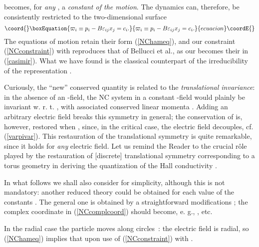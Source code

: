 \documentclass[a4paper,11pt]{article}
\providecommand{\vx}{{\vec x}}
\def\vgamma{{\vec\gamma}}
\def\vE{{\vec E}}
\def\vx{{\vec x}}
\def\vE{{\vec E}}
\begin{document}
becomes, for {\it any} \coordHE{}, a {\it constant of the motion}.
  The dynamics can, therefore,
be consistently restricted to the two-dimensional surface
\begin{equation}\coord{}\boxEquation{
     \varpi_{i}\equiv
     p_{i}-B\varepsilon_{ij}x_{j}=c_{i}.
  \label{NCconstraint}
  }{
     \varpi_{i}\equiv
     p_{i}-B\varepsilon_{ij}x_{j}=c_{i}.
  }{ecuacion}\coordE{}\end{equation}
  The equations of motion retain their
form (\ref{NChameq}), and
our constraint (\ref{NCconstraint}) with \coordHE{}
reproduces that of Bellucci et al.,
as our \coordHE{} becomes their \coordHE{} in (\ref{casimir}).
What we have found is the classical counterpart of
the irreducibility of the \coordHE{} representation \cite{Sochi}.

Curiously, the ``new'' conserved quantity
\myHighlight{$\varpi$}\coordHE{} is related to the {\it translational invariance}:
in the absence of an \myHighlight{$\vE$}\coordHE{}-field, the NC system in a constant
\coordHE{}-field would plainly be
invariant w. r. t. \myHighlight{$\vx\to \vx+\vgamma$}\coordHE{},
with associated conserved linear momenta \coordHE{}.
Adding an arbitrary electric field
breaks this symmetry in general;
the conservation of \myHighlight{$\varpi$}\coordHE{} is, however,
restored when \coordHE{}, since, in the critical case,
the electric field decouples, cf. (\ref{varpivar}).
This restauration of the translational symmetry is quite remarkable,
since it holds for {\it any} electric field.
Let us remind the Reader to the crucial r\^ole played by
the restauration
of [discrete] translational symmetry corresponding to a torus
geometry in deriving the quantization of the
Hall conductivity \cite{QHE}.

In what follows we shall also consider \coordHE{}
for simplicity, although this is not mandatory: another
  reduced theory could be obtained for each value of
the constants \coordHE{}.
The general one is obtained by a straightforward
modifications ; the complex coordinate \coordHE{} in
(\ref{NCcomplcoord})  should become, e. g.,
\coordHE{},
etc.

In the radial case  the particle moves along circles~:
the electric field is radial, so (\ref{NChameq}) implies that
\coordHE{}
upon use of (\ref{NCconstraint}) with \coordHE{}.
\end{document}
